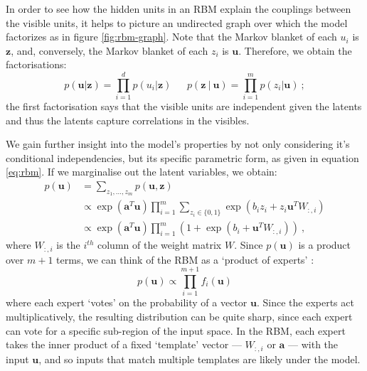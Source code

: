 \documentclass[11pt, oneside]{article}
\renewcommand{\u}{{\mathbf u}}
\newcommand{\z}{{\mathbf z}}
\newcommand\given[1][]{\:#1\vert\:}
\theoremstyle{definition}
\begin{document}
In order to see how the hidden units in an RBM explain the couplings between the visible units, it helps to picture an undirected graph over which the model factorizes as in figure \ref{fig:rbm-graph}. Note that the Markov blanket of each $u_i$ is $\z$, and, conversely, the Markov blanket of each $z_i$ is $\u$. Therefore, we obtain the factorisations:
\begin{equation}
    p(\u | \z) = \prod_{i=1}^d p(u_i | \z)  \ \ \ \ \ \ \ p(\z \given \u) = \prod_{i=1}^m p(z_i | \u) \ ;
    \label{eq: rbm conditional indpendicies}
\end{equation}
the first factorisation says that the visible units are independent given the latents and thus the latents capture correlations in the visibles.

We gain further insight into the model's properties by not only considering it's conditional independencies, but its specific parametric form, as given in equation \ref{eq:rbm}. If we marginalise out the latent variables, we obtain:
\begin{align}
    p(\u) &= \sum_{z_1, ..., z_m} p(\u, \z) \\
          &\propto \exp(\textbf{a}^T\u) \prod_{i=1}^m \sum_{z_i \in \{0, 1\}} \exp(b_i z_i + z_i \u^T W_{:, i}) \\
          &\propto \exp(\textbf{a}^T\u) \prod_{i=1}^m (1 + \exp(b_i + \u^T W_{:, i})) \ ,
          \label{eq:marginal of rbm}
\end{align}
where $W_{:, i}$ is the $i^{th}$ column of the weight matrix $W$. Since $p(\u)$ is a product over $m+1$ terms, we can think of the RBM as a `product of experts' \citep{hinton2006training}:
\begin{equation}
    p(\u) \propto \prod_{i=1}^{m+1} f_i(\u)
\end{equation}
where each expert `votes' on the probability of a vector $\u$. Since the experts act multiplicatively, the resulting distribution can be quite sharp, since each expert can vote for a specific sub-region of the input space. In the RBM, each expert takes the inner product of a fixed `template' vector --- $W_{:,i}$ or $\textbf{a}$ --- with the input $\u$, and so inputs that match multiple templates are likely under the model.

\end{document}
